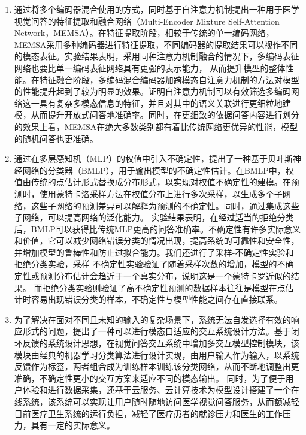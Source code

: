 \begin{enumerate}[topsep = 0 pt, itemsep= 0 pt, parsep=0pt, partopsep=0pt, leftmargin=0pt, itemindent=44pt, labelsep=6pt, label=(\arabic*)]
    \item 通过将多个编码器混合使用的方式，同时基于自注意力机制提出一种用于医学视觉问答的特征提取和融合网络（Multi-Encoder Mixture Self-Attention Network，MEMSA）。在特征提取阶段，相较于传统的单一编码网络，MEMSA采用多种编码器进行特征提取，不同编码器的提取结果可以视作不同的模态表征。实验结果表明，采用同种注意力机制融合的情况下，多编码表征网络也要比单一编码表征网络具有更强的表示能力，
    从而提升模型的整体性能。在特征融合阶段，多编码混合编码器加跨模态自注意力机制的方法对模型的性能提升起到了较为明显的效果。证明自注意力机制可以有效筛选多编码网络这一具有复杂多模态信息的特征，并且对其中的语义关联进行更细粒地建模，从而提升开放式问答地准确率。同时，在更细致的依据问答内容进行划分的效果上看，MEMSA在绝大多数类别都有着比传统网络更优异的性能，模型的随机问答也更准确。
    \item 通过在多层感知机（MLP）\cite{rosenblatt1958perceptron}的权值中引入不确定性，提出了一种基于贝叶斯神经网络的分类器（BMLP），用于输出模型的不确定性估计。在BMLP中，权值由传统的点估计形式替换成分布形式，以实现对权值不确定性的建模。在预测时，使用蒙特卡洛采样方法在权值分布上进行多次采样，以生成多个子网络，这些子网络的预测差异可以解释为预测的不确定性。同时，通过集成这些子网络，可以提高网络的泛化能力。
    实验结果表明，在经过适当的拒绝分类后，BMLP可以获得比传统MLP更高的问答准确率。不确定性有许多实际意义和价值，它可以减少网络错误分类的情况出现，提高系统的可靠性和安全性，并增加模型的鲁棒性和防止过拟合能力。我们还进行了采样-不确定性实验和拒绝分类实验，采样-不确定性实验验证了随着采样次数的增加，模型的不确定性或预测分布估计会趋近于一个真实分布，说明这是一个蒙特卡罗近似的结果。
    而拒绝分类实验则验证了高不确定性预测的数据样本往往是模型在点估计时容易出现错误分类的样本，不确定性与模型性能之间存在直接联系。
    \item 为了解决在面对不同且未知的输入的复杂场景下，系统无法自发选择有效的响应形式的问题，提出了一种可以进行模态自适应的交互系统设计方法。基于闭环反馈的系统设计思想，在视觉问答交互系统中增加多交互模型控制模块，该模块由经典的机器学习分类算法进行设计实现，由用户输入作为输入，以系统反馈作为标签，两者组合成为训练样本训练该分类网络，从而不断地调整出更准确，不确定性更小的交互方案来适应不同的模态输出。
    同时，为了便于用户体验和进行数据采集，还基于云服务、云计算技术为模型设计搭建了一个在线系统，该系统可以实现让用户随时随地访问医学视觉问答服务，从而额减轻目前医疗卫生系统的运行负担，减轻了医疗患者的就诊压力和医生的工作压力，具有一定的实际意义。
\end{enumerate}   

